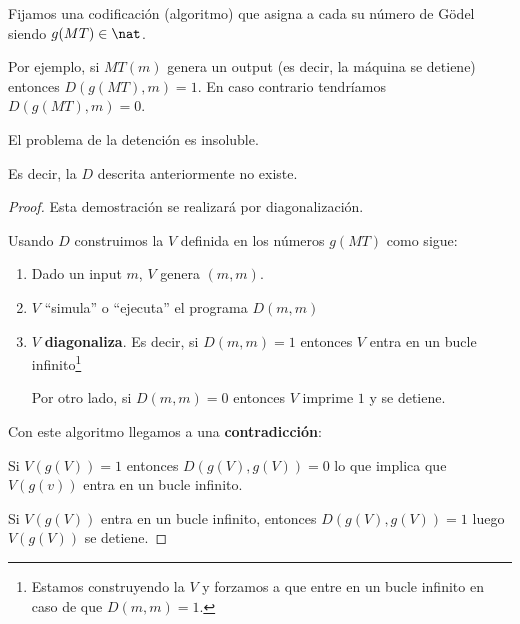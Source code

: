 Fijamos una codificación (algoritmo) que asigna a cada \MT su número de Gödel siendo $g(MT) \in \nat$.

Por ejemplo, si $MT(m)$ genera un output (es decir, la máquina se detiene) entonces $D(g(MT),m)=1$. En caso contrario tendríamos $D(g(MT),m)=0$.

\begin{theorem}
El problema de la detención es insoluble.

Es decir, la \MT $D$ descrita anteriormente no existe.
\end{theorem}
\begin{proof}
Esta demostración se realizará por diagonalización.

Usando $D$ construimos la \MT $V$ definida en los números $g(MT)$ como sigue:
\begin{enumerate}
\item Dado un input $m$, $V$ genera $(m,m)$.
\item $V$ ``simula'' o ``ejecuta'' el programa $D(m,m)$
\item $V$ \textbf{diagonaliza}. Es decir, si $D(m,m)=1$ entonces $V$ entra en un bucle infinito\footnote{Estamos construyendo la \MT $V$ y forzamos a que entre en un bucle infinito en caso de que $D(m,m)=1$.}

Por otro lado, si $D(m,m)=0$ entonces $V$ imprime $1$ y se detiene.
\end{enumerate}

Con este algoritmo llegamos a una \textbf{contradicción}:

Si $V(g(V))=1$ entonces $D(g(V),g(V))=0$ lo que implica que $V(g(v))$ entra en un bucle infinito.

Si $V(g(V))$ entra en un bucle infinito, entonces $D(g(V),g(V))=1$ luego $V(g(V))$ se detiene.

\end{proof}
